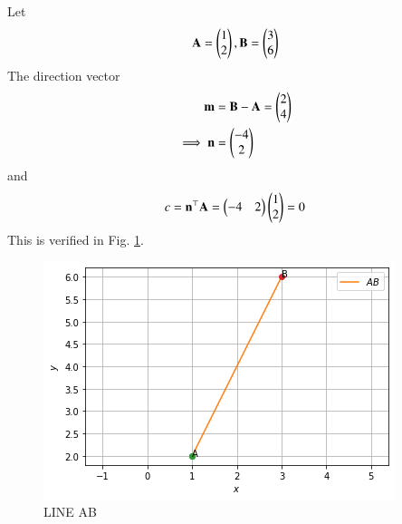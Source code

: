 Let 
	\begin{align}
	 \mathbf{A} = \begin{pmatrix}1\\2\end{pmatrix} , \mathbf{B} = \begin{pmatrix}3 \\ 6\end{pmatrix}
	\end{align}
The direction vector 
\begin{align}
\mathbf{m}&= \mathbf{B}-\mathbf{A}=\begin{pmatrix}2\\4\end{pmatrix}
\\
\implies 
    \mathbf{n}&= \begin{pmatrix}-4\\2\end{pmatrix}
\end{align}
and 
\begin{align}
    c = \mathbf{n}^\top \mathbf {A} = \begin{pmatrix}-4&2\end{pmatrix} \begin{pmatrix}1\\2\end{pmatrix}=0 
\end{align}
This is verified in Fig. \ref{aug/76/2/fig:1}.
\begin{figure}[!ht]
\centering
\includegraphics[width=\columnwidth]{solutions/aug/1/76/2/fig5.png}
\caption{LINE AB}
\label{aug/76/2/fig:1}
\end{figure}
